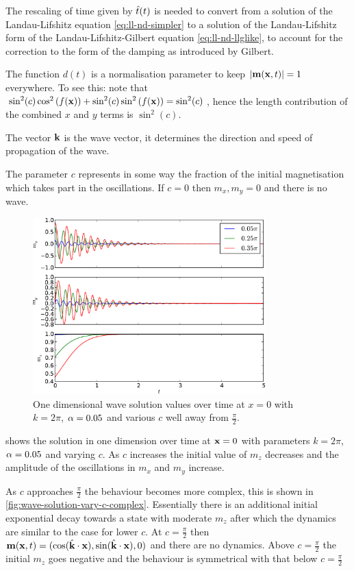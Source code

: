 The rescaling of time given by $\hat{t}(t)$ is needed to convert from a solution of the Landau-Lifshitz equation \cref{eq:ll-nd-simpler} to a solution of the Landau-Lifshitz form of the Landau-Lifshitz-Gilbert equation \cref{eq:ll-nd-llglike}, \ie to account for the correction to the form of the damping as introduced by Gilbert.

The function $d(t)$ is a normalisation parameter to keep $\left|{\boldsymbol{\mathrm{m}}(\boldsymbol{\mathrm{x}}, t)} \right| = 1$ everywhere.
To see this: note that $\sin^2(c) \cos^2{\left( f(\boldsymbol{\mathrm{x}}) \right)} + \sin^2(c) \sin^2{\left( f(\boldsymbol{\mathrm{x}}) \right)} = \sin^2(c)$, hence the length contribution of the combined $x$ and $y$ terms is $\sin^2(c)$.

The vector $\boldsymbol{\mathrm{k}}$ is the wave vector, it determines the direction and speed of propagation of the wave.

The parameter $c$ represents in some way the fraction of the initial magnetisation which takes part in the oscillations.
If $c = 0$ then $m_x, m_y = 0$ and there is no wave.

\begin{figure}
  \centering
  \includegraphics[width=0.8\textwidth]{plots/wave_exact_solution_parameters/exact_solution_parameters.pdf}
  \caption{One dimensional wave solution values over time at $x=0$ with $k = 2\pi$, $\alpha = 0.05$ and various $c$ well away from $\frac{\pi}{2}$.}
  \label{fig:wave-solution-vary-c}
\end{figure}

 shows the solution in one dimension over time at $\boldsymbol{\mathrm{x}} = 0$ with parameters $k = 2\pi$, $\alpha = 0.05$ and varying $c$.
As $c$ increases the initial value of $m_z$ decreases and the amplitude of the oscillations in $m_x$ and $m_y$ increase.

As $c$ approaches $\frac{\pi}{2}$ the behaviour becomes more complex, this is shown in \cref{fig:wave-solution-vary-c-complex}.
Essentially there is an additional initial exponential decay towards a state with moderate $m_z$ after which the dynamics are similar to the case for lower $c$.
At $c=\frac{\pi}{2}$ then $\boldsymbol{\mathrm{m}}(\boldsymbol{\mathrm{x}}, t)= (\cos({\hat{\mathbf{k}}}\cdot\boldsymbol{\mathrm{x}}), \sin({\hat{\mathbf{k}}}\cdot\boldsymbol{\mathrm{x}}), 0)$ and there are no dynamics.
Above $c=\frac{\pi}{2}$ the initial $m_z$ goes negative and the behaviour is symmetrical with that below $c=\frac{\pi}{2}$

